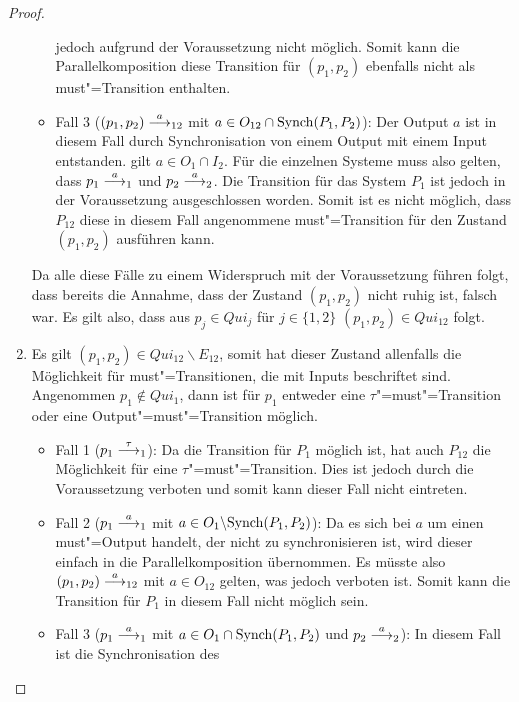\begin{proof}
\begin{enumerate}
\begin{itemize}
          jedoch aufgrund der Voraussetzung nicht möglich. Somit kann die
          Parallelkomposition diese Transition für $(p_1,p_2)$ ebenfalls nicht
          als must"=Transition enthalten.
        \item Fall 3 \big($(p_1,p_2)\must[a]_{12}$ mit $a\in O_{12}\cap\mathrm{Synch}
          (P_1,P_2)$\big): Der Output $a$ ist in diesem Fall durch
          Synchronisation von einem Output mit einem Input entstanden. \OBdA{}
          gilt $a\in O_1\cap I_2$. Für die einzelnen Systeme muss also gelten,
          dass $p_1\must[a]_1$ und $p_2\must[a]_2$. Die Transition für das
          System $P_1$ ist jedoch in der Voraussetzung ausgeschlossen worden.
          Somit ist es nicht möglich, dass $P_{12}$ diese in diesem Fall
          angenommene must"=Transition für den Zustand $(p_1,p_2)$ ausführen
          kann.
      \end{itemize}
      Da alle diese Fälle zu einem Widerspruch mit der Voraussetzung führen
      folgt, dass bereits die Annahme, dass der Zustand $(p_1,p_2)$ nicht ruhig
      ist, falsch war. Es gilt also, dass aus $p_j\in Qui_j$ für $j\in\{1,2\}$
      $(p_1,p_2)\in Qui_{12}$ folgt.
    \item Es gilt $(p_1,p_2)\in Qui_{12}\backslash E_{12}$, somit hat dieser
      Zustand allenfalls die Möglichkeit für must"=Transitionen, die mit Inputs
      beschriftet sind.\\
      Angenommen $p_1\notin Qui _1$, dann ist für $p_1$ entweder eine
      $\tau$"=must"=Transition oder eine Output"=must"=Transition möglich.
      \begin{itemize}
        \item Fall 1 \big($p_1\must[\tau]_1$\big): Da die Transition für $P_1$
          möglich ist, hat auch $P_{12}$ die Möglichkeit für eine
          $\tau$"=must"=Transition. Dies ist jedoch durch die Voraussetzung
          verboten und somit kann dieser Fall nicht eintreten.
        \item Fall 2 \big($p_1\must[a]_1$ mit $a\in O_1\backslash
          \mathrm{Synch}(P_1,P_2)$\big): Da es sich bei $a$ um einen must"=Output
          handelt, der nicht zu synchronisieren ist, wird dieser einfach in die
          Parallelkomposition übernommen. Es müsste also $(p_1,p_2)
          \must[a]_{12}$ mit $a\in O_{12}$ gelten, was jedoch verboten ist.
          Somit kann die Transition für $P_1$ in diesem Fall nicht möglich
          sein.
        \item Fall 3 \big($p_1\must[a]_1$ mit $a\in O_1\cap\mathrm{Synch}(P_1,P_2)$ und
          $p_2\must[a]_2$\big): In diesem Fall ist die Synchronisation des

\end{itemize}
\end{enumerate}
\end{proof}
